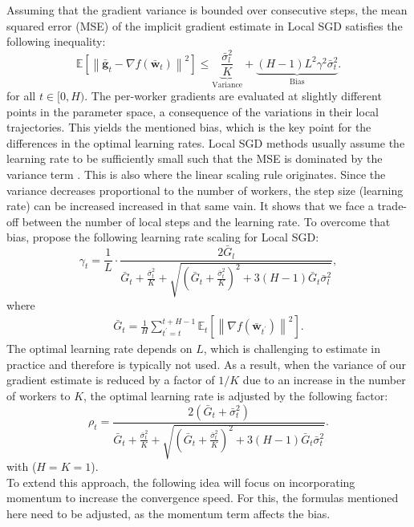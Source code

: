 \documentclass[10pt,twocolumn,letterpaper]{article}
\begin{document}
Assuming that the gradient variance is bounded over consecutive steps, the mean squared error (MSE) of the implicit gradient estimate in Local SGD satisfies the following inequality:
\[
\mathbb{E}\left[\left\|\bar{\mathbf{g}}_{t} - \nabla f\left(\bar{\mathbf{w}}_{t}\right)\right\|^2\right] \leq \underbrace{\frac{\bar{\sigma}_l^2}{K}}_{\text{Variance}} + \underbrace{(H-1) L^2 \gamma^2 \bar{\sigma}_t^2}_{\text{Bias}}.
\]
for all \(t \in [0, H)\). The per-worker gradients are evaluated at slightly different points in the parameter space, a consequence of the variations in their local trajectories. This yields the mentioned bias, which is the key point for the differences in the optimal learning rates.
Local SGD methods usually assume the learning rate to be sufficiently small such that the MSE is dominated by the variance term \cite{BALLES2024P}. This is also where the linear scaling rule originates. Since the variance decreases proportional to the number of workers, the step size (learning rate) can be increased increased in that same vain.
It shows that we face a trade-off between the number of local steps and the learning rate. To overcome that bias, \cite{BALLES2024P} propose the following learning rate scaling for Local SGD:
\begin{equation}
\gamma_t=\frac{1}{L} \cdot \frac{2 \bar{G}_l}{\bar{G}_t+\frac{\bar{\sigma}_t^2}{K}+\sqrt{\left(\bar{G}_t+\frac{\bar{\sigma}_t^2}{K}\right)^2+3(H-1) \bar{G}_t \bar{\sigma}_l^2}},
\end{equation}
where
\begin{align*}
    \bar{G}_t=\frac{1}{H} \sum_{t^{\prime}=t}^{t+H-1} \mathbb{E}_t\left[\left\|\nabla f\left(\bar{\mathbf{w}}_{t^{\prime}}\right)\right\|^2\right].
\end{align*}
The optimal learning rate depends on $L$, which is challenging to estimate in practice and therefore is typically not used. As a result, when the variance of our gradient estimate is reduced by a factor of $1 / K$ due to an increase in the number of workers to $K$, the optimal learning rate is adjusted by the following factor:
\begin{equation}
\rho_t=\frac{2\left(\bar{G}_t+\bar{\sigma}_t^2\right)}{\bar{G}_t+\frac{\bar{\sigma}_t^2}{K}+\sqrt{\left(\bar{G}_t+\frac{\bar{\sigma}_t^2}{K}\right)^2+3(H-1) \bar{G}_t \bar{\sigma}_t^2}} .
\end{equation} with ($H=K=1$).\\
To extend this approach, the following idea will focus on incorporating momentum to increase the convergence speed. For this, the formulas mentioned here need to be adjusted, as the momentum term affects the bias.
\end{document}
